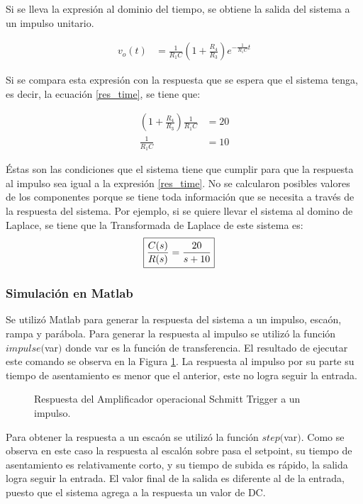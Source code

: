 \documentclass[journal]{IEEEtran}
\begin{document}
Si se lleva la expresi\'on al dominio del tiempo, se obtiene
la salida del sistema a un impulso unitario.
  
\begin{align*}
	v_o(t) & = \frac{1}{R_1 C} 
	\left ( 1 + \frac{R_4}{R_3} \right) 
	 e^{- \frac{1}{R_1 C} t}  	
\end{align*}

Si se compara esta expresi\'on con la respuesta que se 
espera que el sistema tenga, es decir, la ecuación \ref{res_time}, se tiene que: 

\begin{align}
	\label{equAmpl} \left( 1 + \frac{R_4}{R_3} \right)
	\frac{1}{R_1 C} & = 20 \\ 
	\label{equTao} 	\frac{1}{R_1 C} &=  10 
\end{align}

\'Estas son las condiciones que el sistema tiene que cumplir 
para que la respuesta al impulso sea igual a la expresi\'on 
\ref{res_time}. No se calcularon posibles valores de los 
componentes porque se tiene toda informaci\'on que se 
necesita a trav\'es de la respuesta del sistema. 
Por ejemplo, si se
quiere llevar el sistema al domino de Laplace, se tiene 
que la Transformada de Laplace de este sistema es: 
\begin{align}
	\label{tf_primerOrden} \Aboxed {\frac{C(s)}{R(s)} 
	& = \frac{20}{s + 10}}
\end{align}

\subsubsection*{Simulaci\'on en Matlab} Se utiliz\'o Matlab 
para generar la respuesta del sistema a un impulso, esca\'on,
rampa y par\'abola. Para generar la respuesta al impulso se 
utiliz\'o la funci\'on $impulse($var$)$ donde var es la 
funci\'on de transferencia. El resultado de ejecutar este 
comando se observa en la Figura \ref{res_impulso}. 
La respuesta al impulso por su parte su tiempo de
asentamiento es menor que el
anterior, este no logra seguir la entrada.\\

\begin{figure}[h]
\caption{Respuesta del Amplificador 
operacional Schmitt Trigger a un impulso.}
\label{res_impulso}
\end{figure}

Para obtener la respuesta a un esca\'on se utiliz\'o la
funci\'on $step($var$)$. Como se observa en este caso la
respuesta al escal\'on sobre pasa el setpoint, su
tiempo de asentamiento es relativamente corto, y su tiempo 
de subida es rápido, la salida logra seguir la entrada.
El valor final de la salida es diferente al de la entrada, 
puesto que el sistema agrega a la respuesta un valor 
de DC.\\
\end{document}

